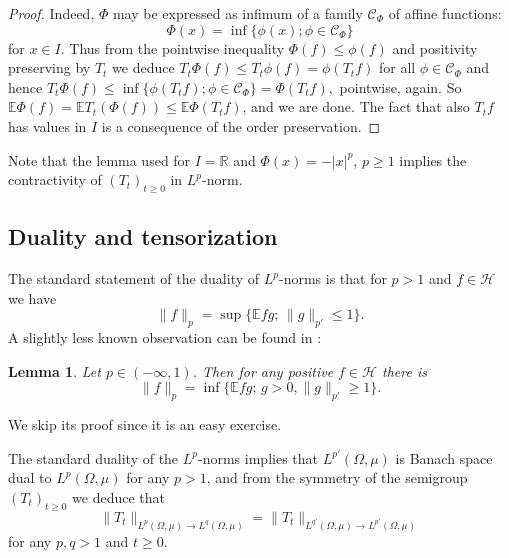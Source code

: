 \documentclass[11pt]{amsart}
\newcommand{\R}{\mathbb{R}}
\newcommand{\E}{\mathbb{E}}
\newcommand{\1}{\mathbf{1}}
\def\R{{\mathbb R}}
\def\E{{\mathbb E}}
\def\H{{\mathcal{H}}}
\theoremstyle{definition}
\theoremstyle{plain}
\newtheorem{lemma}[example]{Lemma}
\theoremstyle{remark}
\numberwithin{equation}{section}
\begin{document}
\begin{proof}
Indeed, $\Phi$ may be expressed as infimum of a family
${\mathcal{C}}_{\Phi}$ of affine functions:
\[
\Phi(x)=\inf\{ \phi(x); \phi \in {\mathcal{C}}_{\Phi} \}
\]
for $x \in I$. Thus from the pointwise inequality
$\Phi(f) \leq \phi(f)$ and positivity preserving
by $T_{t}$ we deduce
$T_{t}\Phi(f) \leq T_{t}\phi(f)=\phi(T_{t}f)$ for all
$\phi \in {\mathcal{C}}_{\Phi}$
and hence
$T_{t}\Phi(f) \leq \inf \{ \phi(T_{t}f);
\phi \in {\mathcal{C}}_{\Phi}\}=
\Phi(T_{t}f),$
pointwise, again. So
$\E \Phi(f)=\E T_{t}(\Phi(f)) \leq \E \Phi(T_{t}f)$, and we are done.
The fact that also $T_{t}f$ has values in $I$ is a consequence of the order preservation.
\end{proof}


Note that the lemma used for $I=\R$ and $\Phi(x)=-|x|^{p}$, $p \geq 1$ implies the contractivity of $(T_{t})_{t \geq 0}$
in $L^{p}$-norm.

\subsection{Duality and tensorization}

The standard statement of the duality of $L^{p}$-norms is that for $p>1$ and $f \in \H$ we have
\[
\| f\|_{p}=\sup \{ \E fg;\, \| g\|_{p'} \leq 1\}.
\]
A slightly less known observation can be found in \cite{Borell82}:
\begin{lemma} \label{rev-hold}
Let $p \in (-\infty,1)$. Then for any positive $f \in \H$
there is
\[
\| f\|_{p}=\inf \{ \E fg;\, g>0, \| g\|_{p'} \geq 1\}.
\]
\end{lemma}

We skip its proof since it is an easy exercise.

The standard duality of the $L^{p}$-norms implies that $L^{p'}(\Omega,\mu)$ is Banach space dual to $L^{p}(\Omega,\mu)$ for any $p>1$, and from the symmetry of the semigroup $(T_{t})_{t \geq 0}$ we deduce that
\[
\|T_{t}\|_{L^{p}(\Omega,\mu) \to L^{q}(\Omega,\mu)}
= \|T_{t}\|_{L^{q'}(\Omega,\mu) \to L^{p'}(\Omega,\mu)}
\]
for any $p,q>1$ and $t \geq 0$.
\end{document}
